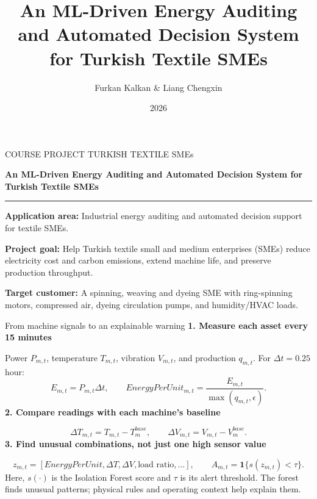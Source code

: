 \documentclass[aspectratio=169,10pt]{beamer}
\title{An ML-Driven Energy Auditing and Automated Decision System for Turkish Textile SMEs}
\author{Furkan Kalkan & Liang Chengxin}
\date{2026}
\begin{document}
\begin{frame}[plain]
  \vspace*{0.08cm}
  {\color{Teal}\small COURSE PROJECT \hfill TURKISH TEXTILE SMEs}\par
  \vspace{0.18cm}
  {\bfseries\fontsize{22}{26}\selectfont\color{Ink}
  An ML-Driven Energy Auditing and Automated
  Decision System for Turkish Textile SMEs}\par
  \vspace{0.25cm}
  {\color{Teal}\rule{1.25cm}{2.2pt}}\par
  \vspace{0.20cm}
  \textbf{Application area:} Industrial energy auditing and automated decision support for textile SMEs.\par
  \vspace{0.13cm}
  \textbf{Project goal:} Help Turkish textile small and medium enterprises (SMEs) reduce electricity cost and carbon emissions, extend machine life, and preserve production throughput.\par
  \vspace{0.13cm}
  \textbf{Target customer:} A spinning, weaving and dyeing SME with ring-spinning motors, compressed air, dyeing circulation pumps, and humidity/HVAC loads.
\end{frame}

\begin{frame}{From machine signals to an explainable warning}
\normalsize
\textbf{1. Measure each asset every 15 minutes}\par
\vspace{1mm}
Power $P_{m,t}$, temperature $T_{m,t}$, vibration $V_{m,t}$, and production $q_{m,t}$. For $\Delta t=0.25$ hour:
\[
  E_{m,t}=P_{m,t}\Delta t,\qquad
  EnergyPerUnit_{m,t}=\frac{E_{m,t}}{\max(q_{m,t},\epsilon)}.
\]
\vspace{-2mm}
\textbf{2. Compare readings with each machine's baseline}\par
\[
  \Delta T_{m,t}=T_{m,t}-T_m^{base},\qquad
  \Delta V_{m,t}=V_{m,t}-V_m^{base}.
\]
\vspace{-2mm}
\textbf{3. Find unusual combinations, not just one high sensor value}\par
\[
  z_{m,t}=[EnergyPerUnit,\Delta T,\Delta V,\text{load ratio},\ldots],\qquad
  A_{m,t}=\mathbf{1}\{s(z_{m,t})<\tau\}.
\]
\normalsize
Here, $s(\cdot)$ is the Isolation Forest score and $\tau$ is its alert threshold. The forest finds unusual patterns; physical rules and operating context help explain them.
\end{frame}
\end{document}
